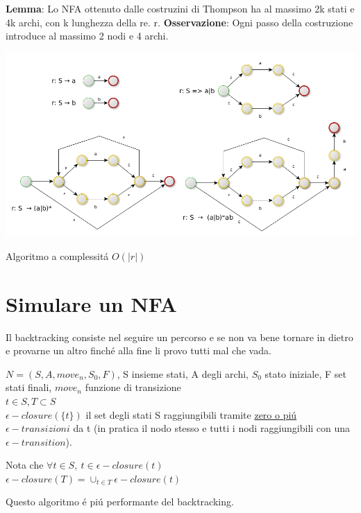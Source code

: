 \textbf{Lemma}: Lo NFA ottenuto dalle costruzini di Thompson ha al massimo 2k stati e 4k archi, con k lunghezza della re. r.
\textbf{Osservazione}: Ogni passo della costruzione introduce al massimo 2 nodi e 4 archi.

\begin{center}
	\includegraphics[scale=0.4]{Chapters/Img/c02_01.png}\\
\end{center} 
Algoritmo a complessit\'a $O(|r|)$ 

\section{Simulare un NFA}
Il backtracking consiste nel seguire un percorso e se non va bene tornare in dietro e provarne un altro finch\'e alla fine 
li provo tutti mal che vada.

$N=(S,A,move_n,S_0,F)$, S insieme stati, A degli archi, $S_0$ stato iniziale, F set stati finali, $move_n$ funzione di transizione\\
$t \in S, T \subset S$\\
$\epsilon - closure(\{ t \})$ il set degli stati S raggiungibili tramite \underline{zero o pi\'u} 
$\epsilon -transizioni$ da t (in pratica il nodo stesso e tutti i nodi raggiungibili con una $\epsilon-transition$).

Nota che $\forall t \in S,\ t\in \epsilon-closure(t)$\\
$\epsilon-closure(T) = \cup _{t \in T} \epsilon-closure(t)$

Questo algoritmo \'e pi\'u performante del backtracking.

